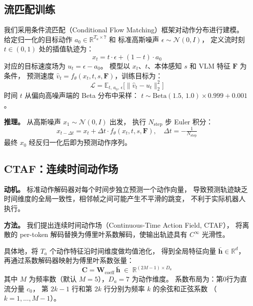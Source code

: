 \documentclass[10pt,twocolumn]{article}
\begin{document}
\subsection{流匹配训练}
\label{sec:flow}

我们采用条件流匹配（Conditional Flow Matching）框架对动作分布进行建模。
给定归一化的目标动作 $a_0 \in \mathbb{R}^{T_a \times 7}$ 和
标准高斯噪声 $\epsilon \sim \mathcal{N}(0, I)$，
定义流时刻 $t \in (0,1)$ 处的插值轨迹为：
\begin{equation}
  x_t = t \cdot \epsilon + (1 - t) \cdot a_0
\end{equation}
对应的目标速度场为 $u_t = \epsilon - a_0$。
模型以 $x_t$、$t$、本体感知 $s$ 和 VLM 特征 $\mathbf{F}$ 为条件，
预测速度 $\hat{v}_t = f_\theta(x_t, t, s, \mathbf{F})$，训练目标为：
\begin{equation}
  \mathcal{L} = \mathbb{E}_{t,\,a_0,\,\epsilon}
    \bigl[\|\hat{v}_t - u_t\|_2^2\bigr]
\end{equation}
时间 $t$ 从偏向高噪声端的 Beta 分布中采样：
$t \sim \mathrm{Beta}(1.5,\, 1.0) \times 0.999 + 0.001$。

\noindent\textbf{推理。}
从高斯噪声 $x_1 \sim \mathcal{N}(0, I)$ 出发，
执行 $N_{\mathrm{step}}$ 步 Euler 积分：
\begin{equation}
  x_{t - \Delta t} = x_t + \Delta t \cdot f_\theta(x_t, t, s, \mathbf{F}),
  \quad \Delta t = -\tfrac{1}{N_{\mathrm{step}}}
\end{equation}
最终 $x_0$ 经反归一化后即为预测动作序列。

\subsection{CTAF：连续时间动作场}
\label{sec:ctaf}

\noindent\textbf{动机。}
标准动作解码器对每个时间步独立预测一个动作向量，
导致预测轨迹缺乏时间维度的全局一致性，相邻帧之间可能产生不平滑的跳变，
不利于实际机器人执行。

\noindent\textbf{方法。}
我们提出连续时间动作场（Continuous-Time Action Field, CTAF），
将离散的 per-token 解码替换为傅里叶系数解码，使输出轨迹具有 $C^\infty$ 光滑性。

具体地，将 $T_a$ 个动作特征沿时间维度做均值池化，
得到全局特征向量 $\bar{\mathbf{h}} \in \mathbb{R}^d$，
再通过系数解码器映射为傅里叶系数张量：
\begin{equation}
  \mathbf{C} = \mathbf{W}_{\mathrm{coeff}}\,\bar{\mathbf{h}}
  \;\in\; \mathbb{R}^{(2M-1) \times D_a}
\end{equation}
其中 $M$ 为频率数（默认 $M{=}5$），$D_a{=}7$ 为动作维度。
系数布局为：第0行为直流分量 $c_0$，
第 $2k{-}1$ 行和第 $2k$ 行分别为频率 $k$ 的余弦和正弦系数
（$k=1,\ldots,M{-}1$）。
\end{document}
